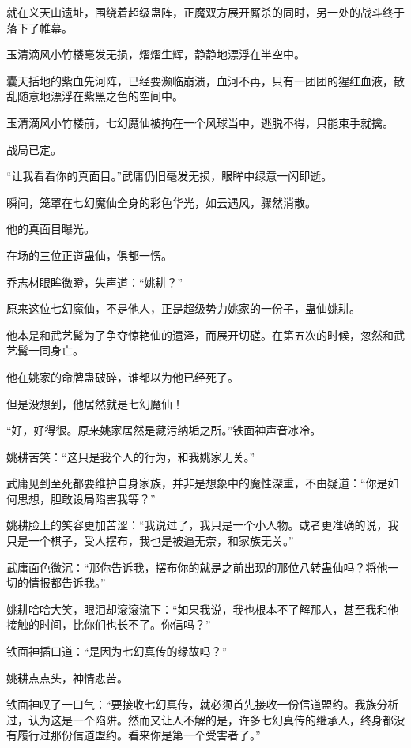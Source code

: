 
\begin{this_body}



就在义天山遗址，围绕着超级蛊阵，正魔双方展开厮杀的同时，另一处的战斗终于落下了帷幕。

玉清滴风小竹楼毫发无损，熠熠生辉，静静地漂浮在半空中。

囊天括地的紫血先河阵，已经要濒临崩溃，血河不再，只有一团团的猩红血液，散乱随意地漂浮在紫黑之色的空间中。

玉清滴风小竹楼前，七幻魔仙被拘在一个风球当中，逃脱不得，只能束手就擒。

战局已定。

“让我看看你的真面目。”武庸仍旧毫发无损，眼眸中绿意一闪即逝。

瞬间，笼罩在七幻魔仙全身的彩色华光，如云遇风，骤然消散。

他的真面目曝光。

在场的三位正道蛊仙，俱都一愣。

乔志材眼眸微瞪，失声道：“姚耕？”

原来这位七幻魔仙，不是他人，正是超级势力姚家的一份子，蛊仙姚耕。

他本是和武艺髯为了争夺惊艳仙的遗泽，而展开切磋。在第五次的时候，忽然和武艺髯一同身亡。

他在姚家的命牌蛊破碎，谁都以为他已经死了。

但是没想到，他居然就是七幻魔仙！

“好，好得很。原来姚家居然是藏污纳垢之所。”铁面神声音冰冷。

姚耕苦笑：“这只是我个人的行为，和我姚家无关。”

武庸见到至死都要维护自身家族，并非是想象中的魔性深重，不由疑道：“你是如何思想，胆敢设局陷害我等？”

姚耕脸上的笑容更加苦涩：“我说过了，我只是一个小人物。或者更准确的说，我只是一个棋子，受人摆布，我也是被逼无奈，和家族无关。”

武庸面色微沉：“那你告诉我，摆布你的就是之前出现的那位八转蛊仙吗？将他一切的情报都告诉我。”

姚耕哈哈大笑，眼泪却滚滚流下：“如果我说，我也根本不了解那人，甚至我和他接触的时间，比你们也长不了。你信吗？”

铁面神插口道：“是因为七幻真传的缘故吗？”

姚耕点点头，神情悲苦。

铁面神叹了一口气：“要接收七幻真传，就必须首先接收一份信道盟约。我族分析过，认为这是一个陷阱。然而又让人不解的是，许多七幻真传的继承人，终身都没有履行过那份信道盟约。看来你是第一个受害者了。”


\end{this_body}
